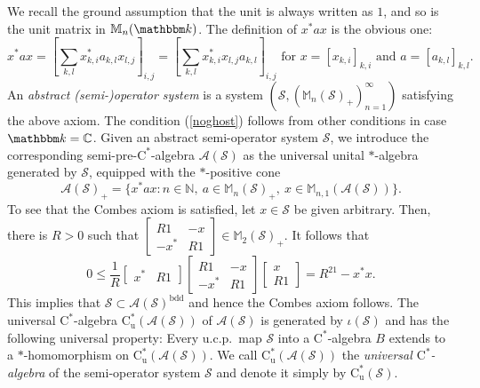 \documentclass[12pt]{amsart}
\theoremstyle{definition}
\begin{document}
We recall the ground assumption that the unit is always written as $1$, and
so is the unit matrix in ${{\mathbb M}}_n({{\mathbbm k}})$. The definition of $x^*ax$ is the obvious one:
\[
x^*ax=[\sum_{k,l}x_{k,i}^*a_{k,l}x_{l,j}]_{i,j}
=[\sum_{k,l}x_{k,i}^*x_{l,j} a_{k,l}]_{i,j}
\mbox{ for }x=[x_{k,i}]_{k,i}
\mbox{ and }a=[a_{k,l}]_{k,l}.
\]
An \emph{abstract (semi-)operator system} is a system $({{\mathcal S}}, ({{\mathbb M}}_n({{\mathcal S}})_+)_{n=1}^\infty)$ satisfying
the above axiom. The condition (\ref{noghost}) follows from other conditions in case ${{\mathbbm k}}={{\mathbb C}}$.
Given an abstract semi-operator system ${{\mathcal S}}$, we introduce the corresponding
{semi-pre-$\mathrm{C}^*$-alge\-bra\xspace} ${{\mathcal A}}({{\mathcal S}})$ as the universal unital $*$-algebra generated by ${{\mathcal S}}$,
equipped with the $*$-positive cone
\[
{{\mathcal A}}({{\mathcal S}})_+=\{ x^*ax : n\in{{\mathbb N}},\ a\in{{\mathbb M}}_n({{\mathcal S}})_+,\ x\in{{\mathbb M}}_{n,1}({{\mathcal A}}({{\mathcal S}}))\}.
\]
To see that the Combes axiom is satisfied, let $x\in{{\mathcal S}}$ be given arbitrary.
Then, there is $R>0$ such that
$\left[\begin{smallmatrix} R1 & -x \\ -x^* & R1\end{smallmatrix}\right]\in{{\mathbb M}}_2({{\mathcal S}})_+$.
It follows that
\[
0\le \frac{1}{R}\begin{bmatrix} x^* & R1\end{bmatrix}
\begin{bmatrix} R1 & -x \\ -x^* & R1\end{bmatrix}\begin{bmatrix} x \\ R1\end{bmatrix}
=R^21-x^*x.
\]
This implies that ${{\mathcal S}}\subset {{\mathcal A}}({{\mathcal S}})^{\mathrm{bdd}}$ and hence the Combes axiom follows.
The universal $\mathrm{C}^*$-algebra $\mathrm{C}^*_{\mathrm{u}}({{\mathcal A}}({{\mathcal S}}))$ of ${{\mathcal A}}({{\mathcal S}})$
is generated by $\iota({{\mathcal S}})$ and has the following universal property:
Every u.c.p.\ map ${{\mathcal S}}$ into a $\mathrm{C}^*$-algebra $B$ extends
to a {$*$-homo\-mor\-phism\xspace} on $\mathrm{C}^*_{\mathrm{u}}({{\mathcal A}}({{\mathcal S}}))$.
We call $\mathrm{C}^*_{\mathrm{u}}({{\mathcal A}}({{\mathcal S}}))$ the \emph{universal $\mathrm{C}^*$-algebra}
of the semi-operator system ${{\mathcal S}}$ and denote it simply by $\mathrm{C}^*_{\mathrm{u}}({{\mathcal S}})$.
\end{document}

